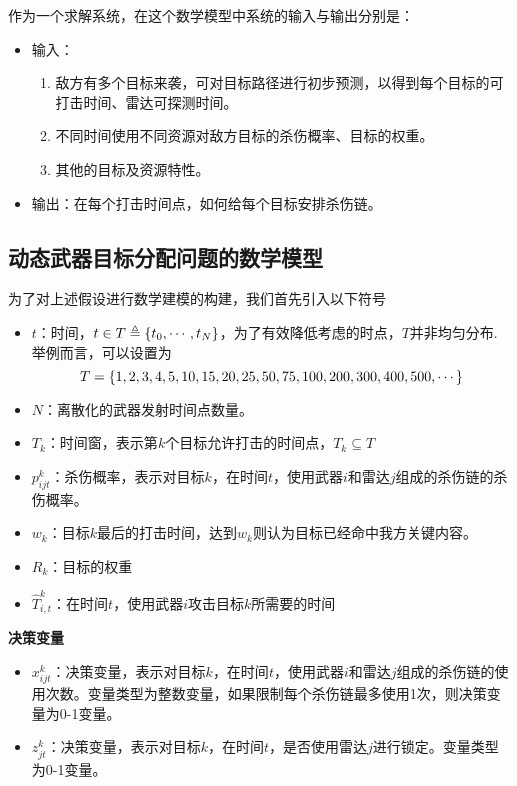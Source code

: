 作为一个求解系统，在这个数学模型中系统的输入与输出分别是：
\begin{itemize}
    \item 输入：
    \begin{enumerate}
        \item 敌方有多个目标来袭，可对目标路径进行初步预测，以得到每个目标的可打击时间、雷达可探测时间。
        \item 不同时间使用不同资源对敌方目标的杀伤概率、目标的权重。
        \item 其他的目标及资源特性。
    \end{enumerate}
    \item 输出：在每个打击时间点，如何给每个目标安排杀伤链。
\end{itemize}



\subsection{动态武器目标分配问题的数学模型}
为了对上述假设进行数学建模的构建，我们首先引入以下符号
\begin{itemize}
    \item $t$：时间，$t \in T \triangleq \{t_0,\cdots,t_N\}$，为了有效降低考虑的时点，$T$并非均匀分布. 举例而言，可以设置为\begin{equation*}
        T = \{1,2,3,4,5,10,15,20,25,50,75,100,200,300,400,500,\cdots\}
    \end{equation*}
    \item $N$：离散化的武器发射时间点数量。
    \item $T_k$：时间窗，表示第$k$个目标允许打击的时间点，$T_k \subseteq T$
    \item $p_{ijt}^k$：杀伤概率，表示对目标$k$，在时间$t$，使用武器$i$和雷达$j$组成的杀伤链的杀伤概率。
    \item $w_k$：目标$k$最后的打击时间，达到$w_k$则认为目标已经命中我方关键内容。
    \item $R_k$：目标的权重
    \item $\hat{T}_{i,t}^k$：在时间$t$，使用武器$i$攻击目标$k$所需要的时间
\end{itemize}

\textbf{决策变量}
\begin{itemize}
    \item  $x_{ijt}^k$：决策变量，表示对目标$k$，在时间$t$，使用武器$i$和雷达$j$组成的杀伤链的使用次数。变量类型为整数变量，如果限制每个杀伤链最多使用1次，则决策变量为0-1变量。
    \item $z_{jt}^k$：决策变量，表示对目标$k$，在时间$t$，是否使用雷达$j$进行锁定。变量类型为0-1变量。
\end{itemize}

